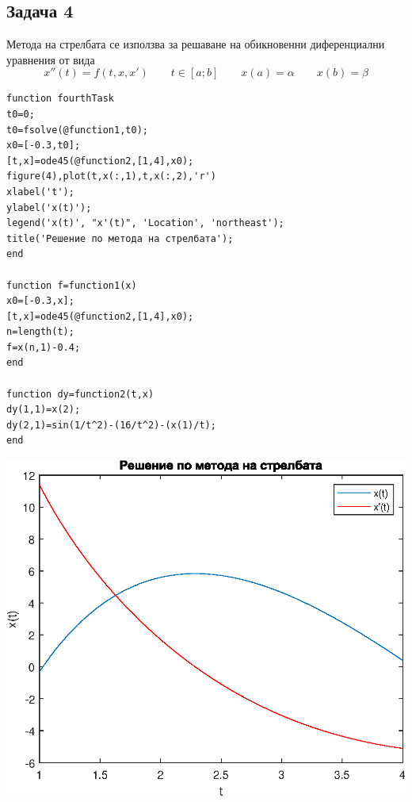 \documentclass[a4paper,fleqn,12pt]{article}
\begin{document}
\newpage
\subsection{Задача 4}
Метода на стрелбата се използва за решаване на обикновенни диференциални уравнения от вида
\begin{equation*}
	x''(t)=f(t,x,x') \qquad t \in [a;b] \qquad x(a) = \alpha \qquad x(b) = \beta
\end{equation*}
\newpage
\begin{verbatim}
function fourthTask
t0=0;
t0=fsolve(@function1,t0);
x0=[-0.3,t0];
[t,x]=ode45(@function2,[1,4],x0);
figure(4),plot(t,x(:,1),t,x(:,2),'r')
xlabel('t');
ylabel('x(t)');
legend('x(t)', "x'(t)", 'Location', 'northeast');
title('Решение по метода на стрелбата');
end

function f=function1(x)
x0=[-0.3,x];
[t,x]=ode45(@function2,[1,4],x0);
n=length(t);
f=x(n,1)-0.4;
end

function dy=function2(t,x)
dy(1,1)=x(2);
dy(2,1)=sin(1/t^2)-(16/t^2)-(x(1)/t);
end
\end{verbatim}
\includegraphics {fourthTask_01.eps}
\end{document}
